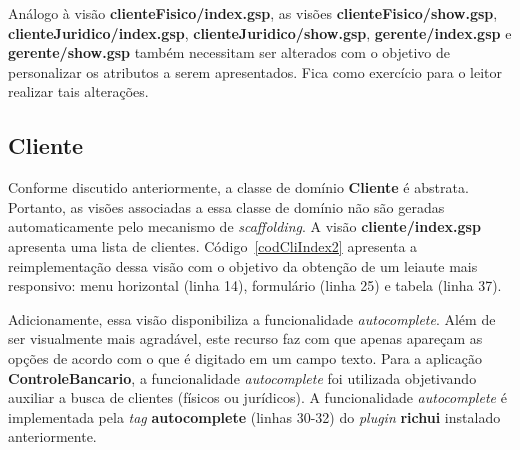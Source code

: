 \vspace{0.5cm}

\begin{remark}
Análogo    à    visão   {\bf    clienteFisico/index.gsp},    as   visões    {\bf
  clienteFisico/show.gsp},       {\bf      clienteJuridico/index.gsp},      {\bf
  clienteJuridico/show.gsp},  {\bf gerente/index.gsp}  e  {\bf gerente/show.gsp}
também necessitam  ser alterados com o  objetivo de personalizar  os atributos a
serem apresentados. Fica como exercício para o leitor realizar tais alterações.  
\end{remark}

\newpage

\subsection{Cliente}

\vspace{0.5cm}

Conforme  discutido   anteriormente,  a  classe  de  domínio   {\bf  Cliente}  é
abstrata.  Portanto, as  visões  associadas a  essa  classe de  domínio não  são
geradas  automaticamente pelo  mecanismo  de {\it  scaffolding}.   A visão  {\bf
  cliente/index.gsp} apresenta uma lista de clientes.  Código~\ref{codCliIndex2}
apresenta a reimplementação dessa visão com o objetivo da obtenção de um leiaute
mais  responsivo: menu  horizontal (linha  14), formulário  (linha 25)  e tabela
(linha 37).  

Adicionamente,    essa    visão     disponibiliza    a    funcionalidade    {\it
  autocomplete}. Além  de ser visualmente  mais agradável, este recurso  faz com
que apenas apareçam as opções de acordo  com o que é digitado em um campo texto.
Para a aplicação {\bf ControleBancario}, a funcionalidade {\it autocomplete} foi
utilizada objetivando  auxiliar a busca  de clientes (físicos ou  jurídicos).  A
funcionalidade   {\it  autocomplete}   é  implementada   pela  {\it   tag}  {\bf
  autocomplete}  (linhas   30-32)  do   {\it  plugin}  {\bf   richui}  instalado
anteriormente.  

